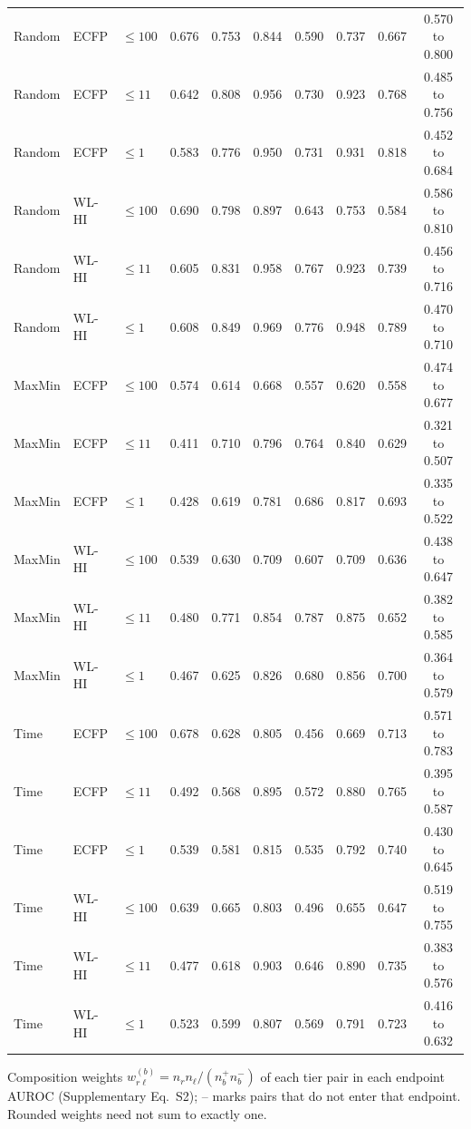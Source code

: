 \begin{longtable}{lllccccccc}
Random & ECFP & $\leq100$ & 0.676 & 0.753 & 0.844 & 0.590 & 0.737 & 0.667 & 0.570 to 0.800 \\
Random & ECFP & $\leq11$ & 0.642 & 0.808 & 0.956 & 0.730 & 0.923 & 0.768 & 0.485 to 0.756 \\
Random & ECFP & $\leq1$ & 0.583 & 0.776 & 0.950 & 0.731 & 0.931 & 0.818 & 0.452 to 0.684 \\
Random & WL-HI & $\leq100$ & 0.690 & 0.798 & 0.897 & 0.643 & 0.753 & 0.584 & 0.586 to 0.810 \\
Random & WL-HI & $\leq11$ & 0.605 & 0.831 & 0.958 & 0.767 & 0.923 & 0.739 & 0.456 to 0.716 \\
Random & WL-HI & $\leq1$ & 0.608 & 0.849 & 0.969 & 0.776 & 0.948 & 0.789 & 0.470 to 0.710 \\
MaxMin & ECFP & $\leq100$ & 0.574 & 0.614 & 0.668 & 0.557 & 0.620 & 0.558 & 0.474 to 0.677 \\
MaxMin & ECFP & $\leq11$ & 0.411 & 0.710 & 0.796 & 0.764 & 0.840 & 0.629 & 0.321 to 0.507 \\
MaxMin & ECFP & $\leq1$ & 0.428 & 0.619 & 0.781 & 0.686 & 0.817 & 0.693 & 0.335 to 0.522 \\
MaxMin & WL-HI & $\leq100$ & 0.539 & 0.630 & 0.709 & 0.607 & 0.709 & 0.636 & 0.438 to 0.647 \\
MaxMin & WL-HI & $\leq11$ & 0.480 & 0.771 & 0.854 & 0.787 & 0.875 & 0.652 & 0.382 to 0.585 \\
MaxMin & WL-HI & $\leq1$ & 0.467 & 0.625 & 0.826 & 0.680 & 0.856 & 0.700 & 0.364 to 0.579 \\
Time & ECFP & $\leq100$ & 0.678 & 0.628 & 0.805 & 0.456 & 0.669 & 0.713 & 0.571 to 0.783 \\
Time & ECFP & $\leq11$ & 0.492 & 0.568 & 0.895 & 0.572 & 0.880 & 0.765 & 0.395 to 0.587 \\
Time & ECFP & $\leq1$ & 0.539 & 0.581 & 0.815 & 0.535 & 0.792 & 0.740 & 0.430 to 0.645 \\
Time & WL-HI & $\leq100$ & 0.639 & 0.665 & 0.803 & 0.496 & 0.655 & 0.647 & 0.519 to 0.755 \\
Time & WL-HI & $\leq11$ & 0.477 & 0.618 & 0.903 & 0.646 & 0.890 & 0.735 & 0.383 to 0.576 \\
Time & WL-HI & $\leq1$ & 0.523 & 0.599 & 0.807 & 0.569 & 0.791 & 0.723 & 0.416 to 0.632 \\

\end{longtable}\endgroup

Composition weights $w_{r\ell}^{(b)}=n_rn_\ell/(n_b^+n_b^-)$ of each tier pair in each endpoint AUROC (Supplementary Eq.~S2); -- marks pairs that do not enter that endpoint. Rounded weights need not sum to exactly one.

